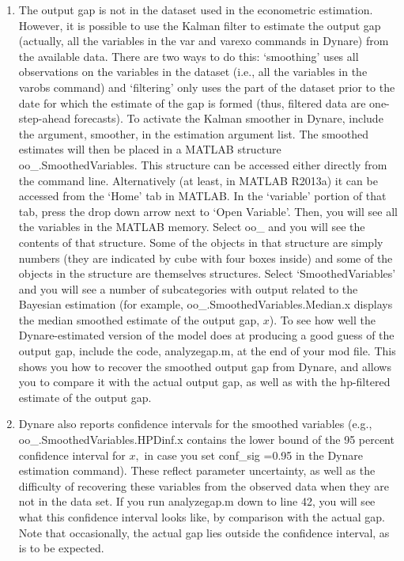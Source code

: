 \documentclass[12pt,thmsa]{article}
\begin{document}
\begin{enumerate}
\item The output gap is not in the dataset used in the econometric
estimation. However, it is possible to use the Kalman filter to estimate the
output gap (actually, all the variables in the var and varexo commands in
Dynare) from the available data. There are two ways to do this: `smoothing'
uses all observations on the variables in the dataset (i.e., all the
variables in the varobs command) and `filtering' only uses the part of the
dataset prior to the date for which the estimate of the gap is formed (thus,
filtered data are one-step-ahead forecasts). To activate the Kalman smoother
in Dynare, include the argument, smoother, in the estimation argument list.
The smoothed estimates will then be placed in a MATLAB structure
oo\_.SmoothedVariables. This structure can be accessed either directly from
the command line. Alternatively (at least, in MATLAB R2013a) it can be
accessed from the `Home' tab in MATLAB. In the `variable' portion of that
tab, press the drop down arrow next to `Open Variable'. Then, you will see
all the variables in the MATLAB memory. Select oo\_ and you will see the
contents of that structure. Some of the objects in that structure are simply
numbers (they are indicated by cube with four boxes inside) and some of the
objects in the structure are themselves structures. Select
`SmoothedVariables' and you will see a number of subcategories with output
related to the Bayesian estimation (for example,
oo\_.SmoothedVariables.Median.x displays the median smoothed estimate of the
output gap, $x$). To see how well the Dynare-estimated version of the model
does at producing a good guess of the output gap, include the code,
analyzegap.m, at the end of your mod file. This shows you how to recover the
smoothed output gap from Dynare, and allows you to compare it with the
actual output gap, as well as with the hp-filtered estimate of the output
gap.

\item Dynare also reports confidence intervals for the smoothed variables
(e.g., oo\_.SmoothedVariables.HPDinf.x contains the lower bound of the 95
percent confidence interval for $x,$ in case you set conf\_sig =0.95 in the
Dynare estimation command). These reflect parameter uncertainty, as well as
the difficulty of recovering these variables from the observed data when
they are not in the data set. If you run analyzegap.m down to line 42, you
will see what this confidence interval looks like, by comparison with the
actual gap. Note that occasionally, the actual gap lies outside the
confidence interval, as is to be expected.


\end{enumerate}
\end{document}

